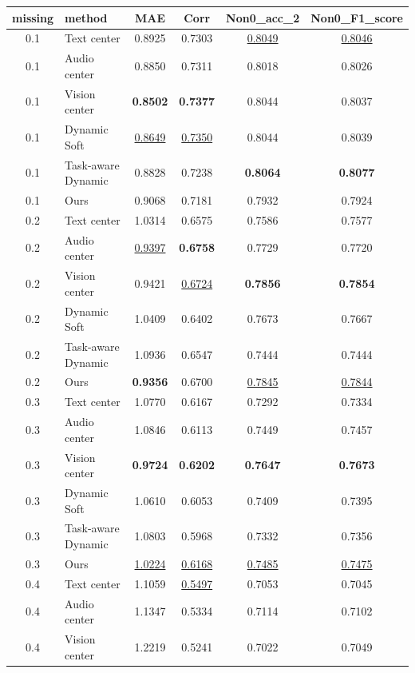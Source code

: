 \begin{table}[t]
\centering
\small
\begin{tabular}{c l c c c c}
\toprule
missing & method & MAE & Corr & Non0_acc_2 & Non0_F1_score \\ 
\midrule
0.1 & Text center & 0.8925 & 0.7303 & \underline{0.8049} & \underline{0.8046} \\ 
0.1 & Audio center & 0.8850 & 0.7311 & 0.8018 & 0.8026 \\ 
0.1 & Vision center & \textbf{0.8502} & \textbf{0.7377} & 0.8044 & 0.8037 \\ 
0.1 & Dynamic Soft & \underline{0.8649} & \underline{0.7350} & 0.8044 & 0.8039 \\ 
0.1 & Task-aware Dynamic & 0.8828 & 0.7238 & \textbf{0.8064} & \textbf{0.8077} \\ 
0.1 & Ours & 0.9068 & 0.7181 & 0.7932 & 0.7924 \\ 
0.2 & Text center & 1.0314 & 0.6575 & 0.7586 & 0.7577 \\ 
0.2 & Audio center & \underline{0.9397} & \textbf{0.6758} & 0.7729 & 0.7720 \\ 
0.2 & Vision center & 0.9421 & \underline{0.6724} & \textbf{0.7856} & \textbf{0.7854} \\ 
0.2 & Dynamic Soft & 1.0409 & 0.6402 & 0.7673 & 0.7667 \\ 
0.2 & Task-aware Dynamic & 1.0936 & 0.6547 & 0.7444 & 0.7444 \\ 
0.2 & Ours & \textbf{0.9356} & 0.6700 & \underline{0.7845} & \underline{0.7844} \\ 
0.3 & Text center & 1.0770 & 0.6167 & 0.7292 & 0.7334 \\ 
0.3 & Audio center & 1.0846 & 0.6113 & 0.7449 & 0.7457 \\ 
0.3 & Vision center & \textbf{0.9724} & \textbf{0.6202} & \textbf{0.7647} & \textbf{0.7673} \\ 
0.3 & Dynamic Soft & 1.0610 & 0.6053 & 0.7409 & 0.7395 \\ 
0.3 & Task-aware Dynamic & 1.0803 & 0.5968 & 0.7332 & 0.7356 \\ 
0.3 & Ours & \underline{1.0224} & \underline{0.6168} & \underline{0.7485} & \underline{0.7475} \\ 
0.4 & Text center & 1.1059 & \underline{0.5497} & 0.7053 & 0.7045 \\ 
0.4 & Audio center & 1.1347 & 0.5334 & 0.7114 & 0.7102 \\ 
0.4 & Vision center & 1.2219 & 0.5241 & 0.7022 & 0.7049 \\ 

\end{tabular}
\end{table}
